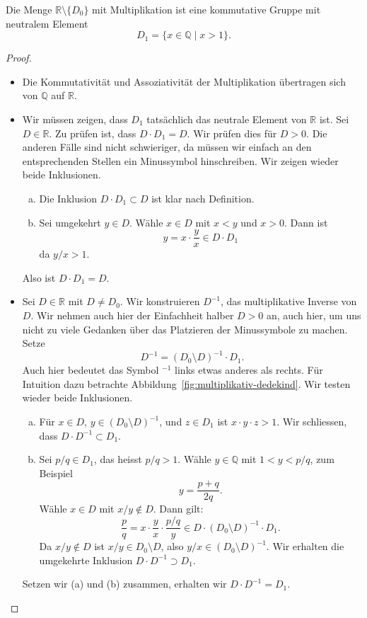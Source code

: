 \documentclass[../main.tex]{subfiles}
\begin{document}
\begin{lemma}\label{lem:r-mal-gruppe}
  Die Menge $\mathbb R \setminus \{D_{0}\}$ mit Multiplikation ist eine
  kommutative Gruppe mit neutralem Element
  \[D_{1} = \{x \in \mathbb Q \mid x > 1\}.\]
\end{lemma}

\begin{proof}
  \leavevmode
  \begin{itemize}
    \item Die Kommutativität und Assoziativität der Multiplikation
      übertragen sich von $\mathbb Q$ auf $\mathbb R$.
    \item Wir müssen zeigen, dass $D_{1}$ tatsächlich das neutrale
      Element von $\mathbb R$ ist.
      Sei $D \in \mathbb R$. Zu prüfen ist, dass $D \cdot D_{1} = D$.
      Wir prüfen dies für $D > 0$. Die anderen Fälle sind nicht
      schwieriger, da müssen wir einfach an den entsprechenden Stellen
      ein Minussymbol hinschreiben.
      Wir zeigen wieder beide Inklusionen.
      \begin{enumerate}[(a)]
        \item Die Inklusion $D \cdot D_{1} \subset D$ ist klar nach Definition.
        \item Sei umgekehrt $y \in D$. Wähle $x \in D$ mit $x < y$ und $x > 0$.
          Dann ist \[y = x \cdot \frac{y}{x} \in D \cdot D_{1}\] da $y/x > 1$.
      \end{enumerate}
      Also ist $D \cdot D_{1} = D$.
    \item
      Sei $D \in \mathbb R$ mit $D \neq D_{0}$.
      Wir konstruieren $D^{-1}$, das multiplikative Inverse von $D$.
      Wir nehmen auch hier der Einfachheit halber $D > 0$ an,
      auch hier, um uns nicht zu viele Gedanken über das Platzieren
      der Minussymbole zu machen. Setze
      \[D^{-1} = {(D_{0} \setminus D)}^{-1} \cdot D_{1}.\]
      Auch hier bedeutet das Symbol ${}^{-1}$ links etwas anderes als rechts.
      Für Intuition dazu betrachte Abbildung~\ref{fig:multiplikativ-dedekind}.
      Wir testen wieder beide Inklusionen.
      \begin{enumerate}[(a)]
        \item Für $x \in D$, $y \in {(D_{0} \setminus D)}^{-1}$, und
          $z \in D_{1}$ ist $x \cdot y \cdot z > 1$.
          Wir schliessen, dass $D \cdot D^{-1} \subset D_{1}$.
        \item Sei $p/q \in D_{1}$, das heisst $p/q > 1$.
          Wähle $y \in \mathbb Q$ mit $1 < y < p/q$, zum Beispiel
          \[y = \frac{p + q}{2q}.\]
          Wähle $x \in D$ mit $x/y \notin D$. Dann gilt:
          \[\frac{p}{q} = x \cdot \frac{y}{x} \cdot
            \frac{p/q}{y}\in D \cdot
          {(D_{0} \setminus D)}^{-1} \cdot D_{1}.\]
          Da $x/y \notin D$ ist $x / y \in D_{0} \setminus D$,
          also $y/x \in {(D_{0} \setminus D)}^{-1}$.
          Wir erhalten die umgekehrte Inklusion $D \cdot D^{-1} \supset D_{1}$.
      \end{enumerate}
      Setzen wir (a) und (b) zusammen, erhalten wir $D \cdot D^{-1} = D_{1}$.
      \qedhere
  \end{itemize}
\end{proof}
\end{document}
